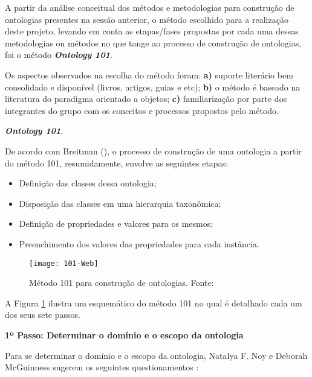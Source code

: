 
  A partir da análise conceitual dos métodos e metodologias para construção de ontologias presentes na sessão anterior, 
  o método escolhido para a realização deste projeto, levando em conta as etapas/fases propostas por cada uma dessas 
  metodologias ou métodos no que tange ao processo de construção de ontologias, foi o método \textit{\textbf{Ontology 101}}.
  
  Os aspectos observados na escolha do método foram: \textbf{a)} suporte literário bem consolidado e disponível 
  (livros, artigos, guias e etc); \textbf{b)} o método é baseado na literatura do paradigma orientado a objetos;
  \textbf{c)} familiarização por parte dos integrantes do grupo com os conceitos e processos propostos pelo método.

\vspace{0.5cm}
  
{\raggedright
  \textit{\textbf{Ontology 101}}.
}
  
  De acordo com Breitman (\citeyear{breitman05}), o processo de construção de uma ontologia a partir do método 101,
  resumidamente, envolve as seguintes etapas:
  \begin{itemize}
   \item Definição das classes dessa ontologia;
   \item Disposição das classes em uma hierarquia taxonômica;
   \item Definição de propriedades e valores para os mesmos;
   \item Preenchimento dos valores das propriedades para cada instância.
  \end{itemize}
  
  \begin{figure}[!htb]
    \centering
    \texttt{[image: 101-Web]}
    \caption[Método 101 para construção de ontologia]{Método 101 para construção de ontologias. Fonte: \cite{bortolato14}}
    \label{fig:101-Web}
  \end{figure}
  
  A Figura \ref{fig:101-Web} ilustra um esquemático do método 101 no qual é detalhado cada um dos seus sete passos.
  
\vspace{0.5cm}  
  
{\raggedright  
  \textbf{1º Passo: Determinar o domínio e o escopo da ontologia}
}
  
  Para se determinar o domínio e o escopo da ontologia, Natalya F. Noy e Deborah McGuinness sugerem os seguintes questionamentos
  \cite{breitman05}:
  
